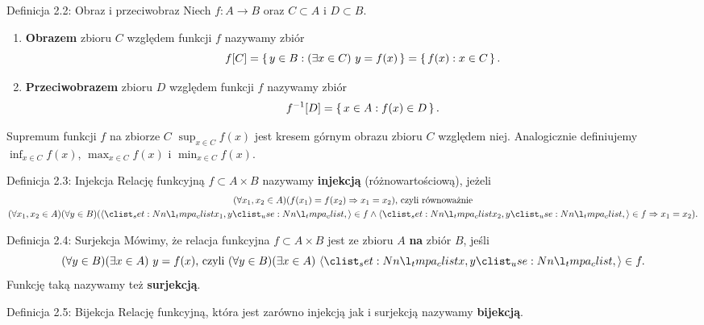 \documentclass{article}
\newcommand{\imp}{\Rightarrow}
\begin{document}
\begin{defr}{Definicja 2.2: Obraz i przeciwobraz}
    Niech $f:A\to B$ oraz $C\subset A$ i $D\subset B$.
    \begin{enumerate}[label=(\arabic*)]
        \item \textbf{Obrazem} zbioru $C$ względem funkcji $f$ nazywamy zbiór
        \begin{equation*}
            f[C]=\set{y\in B: (\exists x\in C)\ y=f(x)}=\set{f(x):x\in C}.
        \end{equation*}
        \item \textbf{Przeciwobrazem} zbioru $D$ względem funkcji $f$ nazywamy zbiór
        \begin{equation*}
            f^{-1}[D]=\set{x\in A:f(x)\in D}.
        \end{equation*}
    \end{enumerate}
\end{defr}

Supremum funkcji $f$ na zbiorze $C$ $\sup_{x\in C}f(x)$ jest kresem górnym obrazu zbioru $C$
względem niej. Analogicznie definiujemy $\inf_{x\in C}f(x)$, $\max_{x\in C}f(x)$ i
$\min_{x\in C}f(x)$.

\begin{defr}{Definicja 2.3: Injekcja}
    Relację funkcyjną $f\subset A\times B$ nazywamy \textbf{injekcją} (różnowartościową), jeżeli
    \begin{gather*}
        (\forall x_1,x_2\in A)(f(x_1)=f(x_2)\imp x_1=x_2)\text{, czyli równoważnie}\\
        (\forall x_1,x_2\in A)(\forall y\in B)(\op{x_1,y}\in f \land \op{x_2,y}\in f\imp x_1=x_2).
    \end{gather*}
\end{defr}

\begin{defr}{Definicja 2.4: Surjekcja}
    Mówimy, że relacja funkcyjna $f\subset A\times B$ jest ze zbioru $A$ \textbf{na} zbiór $B$, jeśli
    \begin{equation*}
        (\forall y\in B)(\exists x\in A)\ y=f(x)\text{, czyli }(\forall y\in B)(\exists x\in A)\ 
        \op{x,y}\in f.
    \end{equation*}
    Funkcję taką nazywamy też \textbf{surjekcją}.
\end{defr}

\begin{defr}{Definicja 2.5: Bijekcja}
    Relację funkcyjną, która jest zarówno injekcją jak i surjekcją nazywamy \textbf{bijekcją}.
\end{defr}
\end{document}
